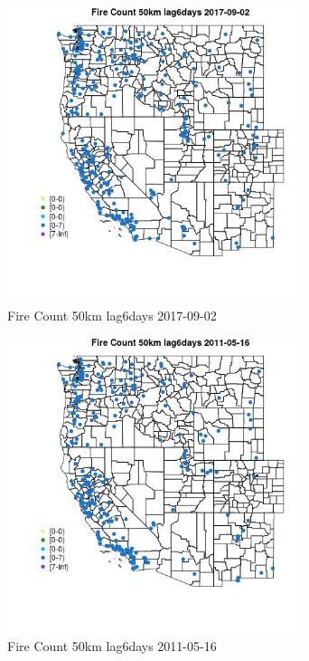 \begin{figure} 
\centering  
\includegraphics[width=0.77\textwidth]{Code_Outputs/Report_ML_input_PM25_Step4_part_e_de_duplicated_aves_compiled_2019-05-21wNAs_MapObsFire_Count_50km_lag6days2017-09-02.jpg} 
\caption{\label{fig:Report_ML_input_PM25_Step4_part_e_de_duplicated_aves_compiled_2019-05-21wNAsMapObsFire_Count_50km_lag6days2017-09-02}Fire Count 50km lag6days 2017-09-02} 
\end{figure} 
 

\clearpage 

\begin{figure} 
\centering  
\includegraphics[width=0.77\textwidth]{Code_Outputs/Report_ML_input_PM25_Step4_part_e_de_duplicated_aves_compiled_2019-05-21wNAs_MapObsFire_Count_50km_lag6days2011-05-16.jpg} 
\caption{\label{fig:Report_ML_input_PM25_Step4_part_e_de_duplicated_aves_compiled_2019-05-21wNAsMapObsFire_Count_50km_lag6days2011-05-16}Fire Count 50km lag6days 2011-05-16} 
\end{figure} 
 

